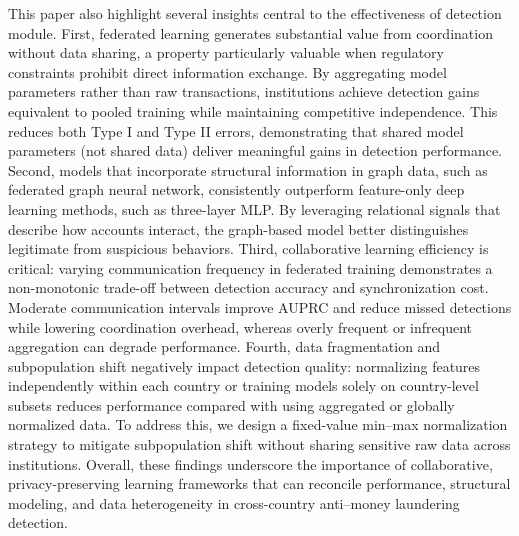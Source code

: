 This paper also highlight several insights central to the effectiveness of detection module. First, federated learning generates substantial value from coordination without data sharing, a property particularly valuable when regulatory constraints prohibit direct information exchange. By aggregating model parameters rather than raw transactions, institutions achieve detection gains equivalent to pooled training while maintaining competitive independence. This reduces both Type I and Type II errors, demonstrating that shared model parameters (not shared data) deliver meaningful gains in detection performance. Second, models that incorporate structural information in graph data, such as federated graph neural network, consistently outperform feature-only deep learning methods, such as three-layer MLP. By leveraging relational signals that describe how accounts interact, the graph-based model better distinguishes legitimate from suspicious behaviors. 
Third, collaborative learning efficiency is critical: varying communication frequency in federated training demonstrates a non-monotonic trade-off between detection accuracy and synchronization cost. Moderate communication intervals improve AUPRC and reduce missed detections while lowering coordination overhead, whereas overly frequent or infrequent aggregation can degrade performance. 
Fourth, data fragmentation and subpopulation shift negatively impact detection quality: normalizing features independently within each country or training models solely on country-level subsets reduces performance compared with using aggregated or globally normalized data. To address this, we design a fixed-value min–max normalization strategy to mitigate subpopulation shift without sharing sensitive raw data across institutions. Overall, these findings underscore the importance of collaborative, privacy-preserving learning frameworks that can reconcile performance, structural modeling, and data heterogeneity in cross-country anti–money laundering detection.


